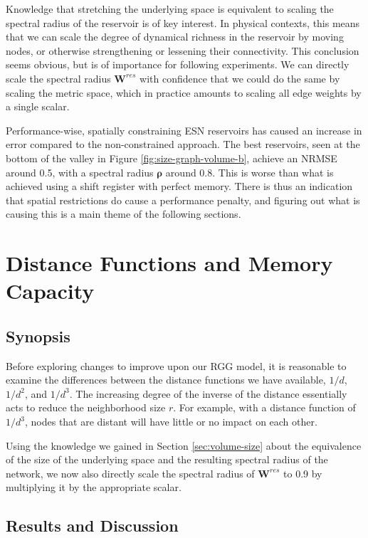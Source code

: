 Knowledge that stretching the underlying space is equivalent to scaling the
spectral radius of the reservoir is of key interest. In physical contexts, this
means that we can scale the degree of dynamical richness in the reservoir by
moving nodes, or otherwise strengthening or lessening their connectivity. This
conclusion seems obvious, but is of importance for following experiments. We can
directly scale the spectral radius $\mathbf{W}^{res}$ with confidence that we
could do the same by scaling the metric space, which in practice amounts to
scaling all edge weights by a single scalar.

Performance-wise, spatially constraining ESN reservoirs has caused an increase
in error compared to the non-constrained approach. The best reservoirs, seen at
the bottom of the valley in Figure \ref{fig:size-graph-volume-b}, achieve an
NRMSE around 0.5, with a spectral radius $\boldsymbol{\rho}$ around 0.8. This is
worse than what is achieved using a shift register with perfect memory. There is
thus an indication that spatial restrictions do cause a performance penalty, and
figuring out what is causing this is a main theme of the following sections.

\section{Distance Functions and Memory Capacity}
\label{sec:dist-func}

\subsection{Synopsis}

Before exploring changes to improve upon our RGG model, it is reasonable to
examine the differences between the distance functions we have available, $1/d$,
$1/d^2$, and $1/d^3$. The increasing degree of the inverse of the distance
essentially acts to reduce the neighborhood size $r$. For example, with a
distance function of $1/d^3$, nodes that are distant will have little or no
impact on each other.

Using the knowledge we gained in Section \ref{sec:volume-size} about the
equivalence of the size of the underlying space and the resulting spectral
radius of the network, we now also directly scale the spectral radius of
$\mathbf{W}^{res}$ to 0.9 by multiplying it by the appropriate scalar.

\subsection{Results and Discussion}


